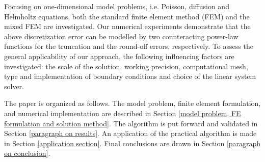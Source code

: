 \documentclass[final,3p]{elsarticle}
\begin{document}

Focusing on one-dimensional model problems, i.e. Poisson, diffusion and Helmholtz equations, both the standard finite element method (FEM) and the mixed FEM are investigated.
Our numerical experiments demonstrate that the above discretization error can be modelled by two counteracting power-law functions for the truncation and the round-off errors, respectively. 
To assess the general applicability of our approach, the following influencing factors are investigated: the scale of the solution, working precision, computational mesh, type and implementation of boundary conditions and choice of the linear system solver.


The paper is organized as follows. The model problem, finite element formulation, and numerical implementation are described in Section \ref{model problem, FE formulation and solution method}. The algorithm is put forward and validated in Section \ref{paragraph on results}. An application of the practical algorithm is made in Section \ref{application section}. Final conclusions are drawn in Section \ref{paragraph on conclusion}.

\end{document}

